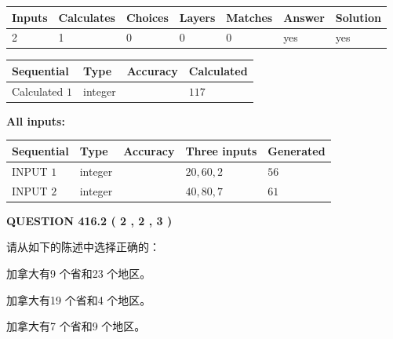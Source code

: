 \documentclass{ctexart}
\begin{document}
   
\noindent\begin{tabular}{|l|l|l|l|l|l|l|}
 \hline
Inputs & Calculates & Choices & Layers & Matches & Answer & Solution \\ \hline
 2  & 
 1  & 
 0
  & 
 0  & 
 0  & 
  yes & 
  yes 
  \\ \hline
 \end{tabular}
   
   
   
   
\noindent{}
   
   
  
  
\noindent\begin{tabular}{|l|l|l|l|}
\hline
 Sequential & Type & Accuracy & Calculated \\ 
\hline
 
 
  Calculated $  1 $ & integer &  & 
  $ 117 $ 
 \\  \hline  
 \end{tabular}
   
   
   
   
\noindent\vspace{0.1in}\hspace{-0.08in} {\textbf{\Large{All inputs: }}}
   
   
  
  
\noindent\begin{tabular}{|l|l|l|l|l|}
\hline
 Sequential & Type & Accuracy & Three inputs & Generated \\ 
\hline
 
 
  INPUT $  1 $ & integer &  & $
 20
 , 
 60
 , 
 2
 $ & $ 56 $ 
 \\  \hline  
 
 
  INPUT $  2 $ & integer &  & $
 40
 , 
 80
 , 
 7
 $ & $ 61 $ 
 \\  \hline  
 \end{tabular}
   
   
  
\vspace{0.2in}
  
{\textbf{\Large{QUESTION
416.2 
 ( 2 , 2 , 3 )
}}}
  
  
请从如下的陈述中选择正确的：
 
 
加拿大有9 个省和23 个地区。
 
 
加拿大有19 个省和4 个地区。
 
 
加拿大有7 个省和9 个地区。
 
\end{document}
